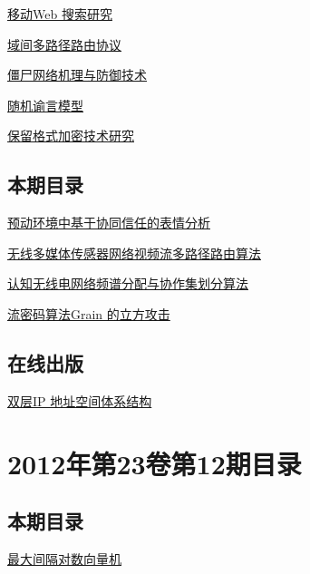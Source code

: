 \documentclass[a4paper]{article}
\begin{document}
\href{http://www.jos.org.cn/ch/reader/download_pdf.aspx?file_no=4120&year_id=2012&quarter_id=1&falg=1}{移动Web 搜索研究}

\href{http://www.jos.org.cn/ch/reader/download_pdf.aspx?file_no=4119&year_id=2012&quarter_id=1&falg=1}{域间多路径路由协议}

\href{http://www.jos.org.cn/ch/reader/download_pdf.aspx?file_no=4101&year_id=2012&quarter_id=1&falg=1}{僵尸网络机理与防御技术}

\href{http://www.jos.org.cn/ch/reader/download_pdf.aspx?file_no=4092&year_id=2012&quarter_id=1&falg=1}{随机谕言模型}

\href{http://www.jos.org.cn/ch/reader/download_pdf.aspx?file_no=4096&year_id=2012&quarter_id=1&falg=1}{保留格式加密技术研究}

\subsection{本期目录}
\href{http://www.jos.org.cn/ch/reader/download_pdf.aspx?file_no=3981&year_id=2012&quarter_id=1&falg=1}{预动环境中基于协同信任的表情分析}

\href{http://www.jos.org.cn/ch/reader/download_pdf.aspx?file_no=4070&year_id=2012&quarter_id=1&falg=1}{无线多媒体传感器网络视频流多路径路由算法}

\href{http://www.jos.org.cn/ch/reader/download_pdf.aspx?file_no=4077&year_id=2012&quarter_id=1&falg=1}{认知无线电网络频谱分配与协作集划分算法}

\href{http://www.jos.org.cn/ch/reader/download_pdf.aspx?file_no=3983&year_id=2012&quarter_id=1&falg=1}{流密码算法Grain 的立方攻击}

\subsection{在线出版}
\href{http://www.jos.org.cn/ch/reader/download_pdf.aspx?file_no=4066&year_id=2012&quarter_id=1&falg=1}{双层IP 地址空间体系结构}


\section{\textbf{2012年第23卷第12期目录}}
\subsection{本期目录}
\href{http://www.jos.org.cn/ch/reader/download_pdf.aspx?file_no=4209&year_id=2012&quarter_id=12&falg=1}{最大间隔对数向量机}
\end{document}
